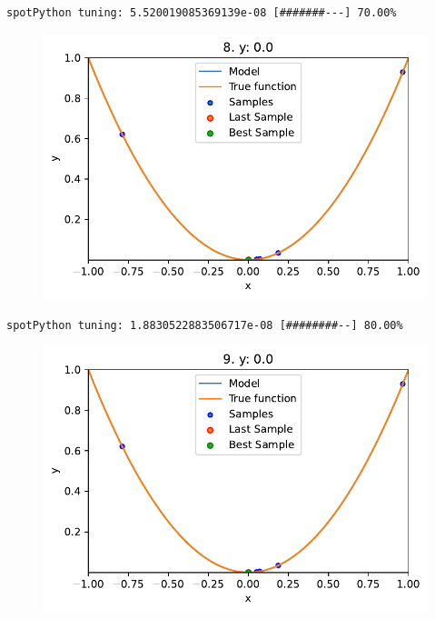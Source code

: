 \documentclass[
  letterpaper,
  DIV=11,
  numbers=noendperiod]{scrreprt}
\begin{document}
\begin{verbatim}
spotPython tuning: 5.520019085369139e-08 [#######---] 70.00% 
\end{verbatim}

\begin{figure}[H]

{\centering \includegraphics{04_spot_sklearn_surrogate_files/figure-pdf/cell-25-output-10.pdf}

}

\end{figure}

\begin{verbatim}
spotPython tuning: 1.8830522883506717e-08 [########--] 80.00% 
\end{verbatim}

\begin{figure}[H]

{\centering \includegraphics{04_spot_sklearn_surrogate_files/figure-pdf/cell-25-output-12.pdf}

}

\end{figure}
\end{document}
